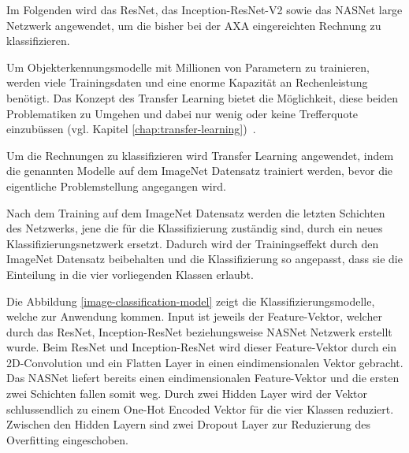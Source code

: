 
Im Folgenden wird das ResNet, das Inception-ResNet-V2 sowie das NASNet large Netzwerk angewendet, um die bisher bei der AXA eingereichten Rechnung zu klassifizieren.

Um Objekterkennungsmodelle mit Millionen von Parametern zu trainieren, werden viele Trainingsdaten und eine enorme Kapazität an Rechenleistung benötigt. Das Konzept des Transfer Learning bietet die Möglichkeit, diese beiden Problematiken zu Umgehen und dabei nur wenig oder keine Trefferquote einzubüssen (vgl. Kapitel \ref{chap:transfer-learning})~\autocite{TDSTransferLearning}. %

Um die Rechnungen zu klassifizieren wird Transfer Learning angewendet, indem die genannten Modelle auf dem ImageNet Datensatz trainiert werden, bevor die eigentliche Problemstellung angegangen wird.

Nach dem Training auf dem ImageNet Datensatz werden die letzten Schichten des Netzwerks, jene die für die Klassifizierung zuständig sind, durch ein neues Klassifizierungsnetzwerk ersetzt. Dadurch wird der Trainingseffekt durch den ImageNet Datensatz beibehalten und die Klassifizierung so angepasst, dass sie die Einteilung in die vier vorliegenden Klassen erlaubt.

Die Abbildung \ref{image-classification-model} zeigt die Klassifizierungsmodelle, welche zur Anwendung kommen. Input ist jeweils der Feature-Vektor, welcher durch das ResNet, Inception-ResNet beziehungsweise NASNet Netzwerk erstellt wurde. Beim ResNet und Inception-ResNet wird dieser Feature-Vektor durch ein 2D-Convolution und ein Flatten Layer in einen eindimensionalen Vektor gebracht. Das NASNet liefert bereits einen eindimensionalen Feature-Vektor und die ersten zwei Schichten fallen somit weg. Durch zwei Hidden Layer wird der Vektor schlussendlich zu einem One-Hot Encoded Vektor für die vier Klassen reduziert. Zwischen den Hidden Layern sind zwei Dropout Layer zur Reduzierung des Overfitting eingeschoben.


